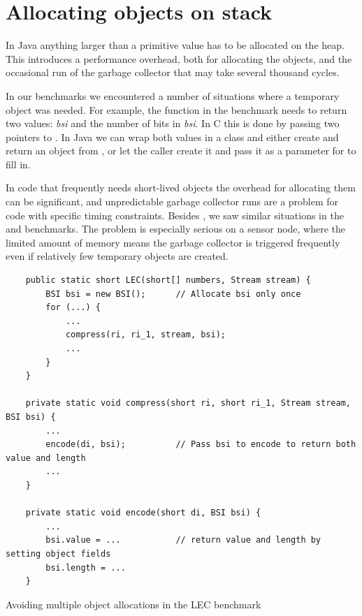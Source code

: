 \section{Allocating objects on stack}
\label{sec-no-gc}
In Java anything larger than a primitive value has to be allocated on the heap. This introduces a performance overhead, both for allocating the objects, and the occasional run of the garbage collector that may take several thousand cycles.

In our benchmarks we encountered a number of situations where a temporary object was needed. For example, the  function in the  benchmark needs to return two values: \emph{bsi} and the number of bits in \emph{bsi}. In C this is done by passing two pointers to . In Java we can wrap both values in a class and either create and return an object from , or let the caller create it and pass it as a parameter for  to fill in.

In code that frequently needs short-lived objects the overhead for allocating them can be significant, and unpredictable garbage collector runs are a problem for code with specific timing constraints. Besides , we saw similar situations in the  and  benchmarks. The problem is especially serious on a sensor node, where the limited amount of memory means the garbage collector is triggered frequently even if relatively few temporary objects are created.

\begin{listing}
\begin{verbatim}
    public static short LEC(short[] numbers, Stream stream) {
        BSI bsi = new BSI();      // Allocate bsi only once
        for (...) {
            ...
            compress(ri, ri_1, stream, bsi);
            ...
        }
    }

    private static void compress(short ri, short ri_1, Stream stream, BSI bsi) {
        ...
        encode(di, bsi);          // Pass bsi to encode to return both value and length
        ...
    }

    private static void encode(short di, BSI bsi) {
        ...
        bsi.value = ...           // return value and length by setting object fields
        bsi.length = ...
    }
\end{verbatim}
\caption{Avoiding multiple object allocations in the LEC benchmark}
\label{lst-lec-avoiding-object-allocations}
\end{listing}

